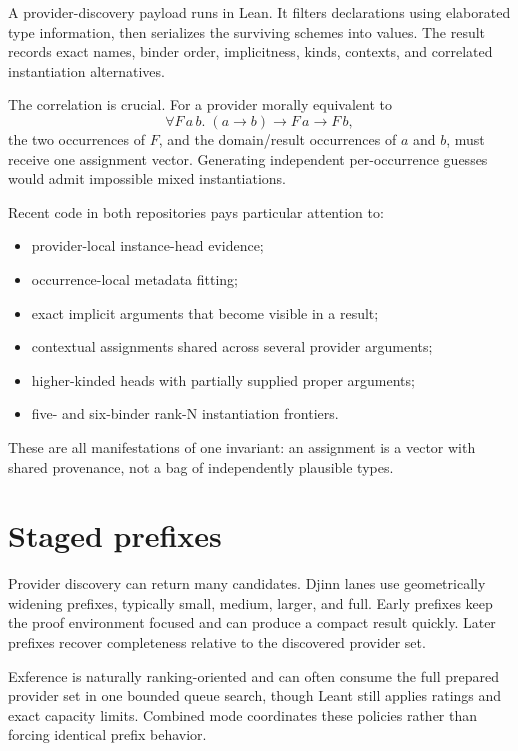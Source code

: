 \documentclass[10pt,letterpaper,oneside]{report}
\newcommand{\code}[1]{\texttt{\detokenize{#1}}}
\begin{document}
A provider-discovery payload runs in Lean. It filters declarations using elaborated type information, then serializes the surviving schemes into \code{ProviderFrag} values. The result records exact names, binder order, implicitness, kinds, contexts, and correlated instantiation alternatives.

The correlation is crucial. For a provider morally equivalent to
\[
  \forall F\,a\,b.\;(a \to b) \to F\,a \to F\,b,
\]
the two occurrences of \(F\), and the domain/result occurrences of \(a\) and \(b\), must receive one assignment vector. Generating independent per-occurrence guesses would admit impossible mixed instantiations.

Recent code in both repositories pays particular attention to:

\begin{itemize}
  \item provider-local instance-head evidence;
  \item occurrence-local metadata fitting;
  \item exact implicit arguments that become visible in a result;
  \item contextual assignments shared across several provider arguments;
  \item higher-kinded heads with partially supplied proper arguments;
  \item five- and six-binder rank-N instantiation frontiers.
\end{itemize}

These are all manifestations of one invariant: an assignment is a vector with shared provenance, not a bag of independently plausible types.

\section{Staged prefixes}

Provider discovery can return many candidates. Djinn lanes use geometrically widening prefixes, typically small, medium, larger, and full. Early prefixes keep the proof environment focused and can produce a compact result quickly. Later prefixes recover completeness relative to the discovered provider set.

Exference is naturally ranking-oriented and can often consume the full prepared provider set in one bounded queue search, though Leant still applies ratings and exact capacity limits. Combined mode coordinates these policies rather than forcing identical prefix behavior.
\end{document}

